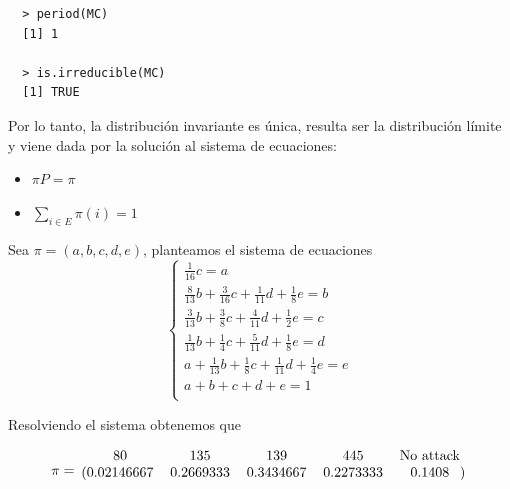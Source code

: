 \documentclass[11pt]{article}
\begin{document}
\begin{verbatim}
  > period(MC)
  [1] 1

  > is.irreducible(MC)
  [1] TRUE  
\end{verbatim}

Por lo tanto, la distribución invariante es única, resulta ser la distribución
límite y viene dada por la solución al sistema de ecuaciones:

\begin{itemize}
  \item $\pi P = \pi$
  \item $\displaystyle\sum_{i \in E} \pi(i) = 1$
\end{itemize}

Sea $ \pi = (a, b, c, d, e) $, planteamos el sistema de ecuaciones
\[
\begin{cases}
  \frac{1}{16}c = a \\
  \frac{8}{13}b + \frac{3}{16}c + \frac{1}{11}d + \frac{1}{8}e = b \\
  \frac{3}{13}b + \frac{3}{8}c + \frac{4}{11}d + \frac{1}{2}e = c \\
  \frac{1}{13}b + \frac{1}{4}c + \frac{5}{11}d + \frac{1}{8}e = d \\
  a + \frac{1}{13}b + \frac{1}{8}c + \frac{1}{11}d + \frac{1}{4}e = e \\
  a + b + c + d + e = 1 \\
\end{cases}
\]

Resolviendo el sistema obtenemos que

\begin{equation*}
  \pi = 
  \begin{blockarray}{ccccc}
    80 & 135 & 139 & 445 & \text{No attack} \\
    \begin{block}{(ccccc)}
      0.02146667 & 0.2669333 & 0.3434667 & 0.2273333 & 0.1408 \\
    \end{block}
  \end{blockarray}
\end{equation*}

\end{document}
